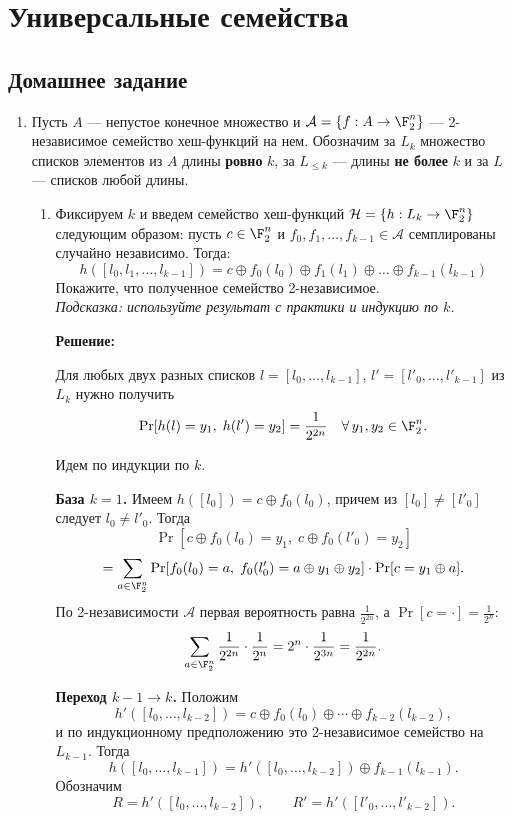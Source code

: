 \section{Универсальные семейства}

\subsection{Домашнее задание}
\begin{enumerate}
  \item
    Пусть $A$ --- непустое конечное множество и $\mathcal{A} = \{ f : A \rightarrow \F_2^n \}$ --- 2-независимое семейство хеш-функций на нем.
    Обозначим за $L_k$ множество списков элементов из $A$ длины \textbf{ровно} $k$, за $L_{\le k}$ --- длины \textbf{не более} $k$ и за $L$ --- списков любой длины.
    \begin{enumerate}
      \item
        Фиксируем $k$ и введем семейство хеш-функций $\mathcal{H} = \{ h : L_k \rightarrow \F_2^n \}$ следующим образом:
        пусть $c \in \F_2^n$ и $f_0, f_1, \dots, f_{k-1} \in \mathcal{A}$ семплированы случайно независимо.
        Тогда: $$h([ l_0, l_1, \dots, l_{k-1} ]) = c \oplus f_0(l_0) \oplus f_1(l_1) \oplus \dots \oplus f_{k-1}(l_{k-1})$$
        Покажите, что полученное семейство 2-независимое. \\
        \textit{Подсказка: используйте результат с практики и индукцию по $k$.}

        \textbf{Решение:}

        Для любых двух разных списков
        $l = [l_0, \ldots, l_{k-1}]$, $l' = [l'_0, \ldots, l'_{k-1}]$ из $L_k$ нужно получить
        $$\Pr[h(l) = y_1,\; h(l') = y_2] = \frac{1}{2^{2n}} \quad \forall\, y_1, y_2 \in \F_2^n.$$

        Идем по индукции по $k$.

        \textbf{База $k=1$.}
        Имеем $h([l_0]) = c \oplus f_0(l_0)$, причем из $[l_0] \ne [l'_0]$ следует $l_0 \ne l'_0$.
        Тогда
        $$\Pr[c \oplus f_0(l_0) = y_1,\; c \oplus f_0(l'_0) = y_2]$$
        $$= \sum_{a \in \F_2^n}
        \Pr[f_0(l_0)=a,\; f_0(l'_0)=a\oplus y_1\oplus y_2]\cdot \Pr[c=y_1\oplus a].$$
        По 2-независимости $\mathcal A$ первая вероятность равна $\frac{1}{2^{2n}}$, а $\Pr[c=\cdot]=\frac{1}{2^n}$:
        $$\sum_{a \in \F_2^n} \frac{1}{2^{2n}}\cdot \frac{1}{2^n}
        = 2^n \cdot \frac{1}{2^{3n}} = \frac{1}{2^{2n}}.$$

        \textbf{Переход $k-1 \to k$.}
        Положим
        $$h'([l_0,\ldots,l_{k-2}]) = c \oplus f_0(l_0)\oplus \cdots \oplus f_{k-2}(l_{k-2}),$$
        и по индукционному предположению это 2-независимое семейство на $L_{k-1}$.
        Тогда
        $$h([l_0,\ldots,l_{k-1}]) = h'([l_0,\ldots,l_{k-2}]) \oplus f_{k-1}(l_{k-1}).$$
        Обозначим
        $$R=h'([l_0,\ldots,l_{k-2}]), \qquad R'=h'([l'_0,\ldots,l'_{k-2}]).$$


\end{enumerate}
\end{enumerate}
